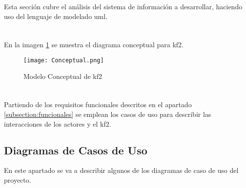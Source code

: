 

Esta sección cubre el análisis del sistema de información a desarrollar, haciendo uso del lenguaje de modelado \gls{uml}.

\section{}

En la imagen \ref{image:modeloconceptual} se muestra el diagrama conceptual para \gls{kf2}.

\begin{figure}[H]
  \centering
     \texttt{[image: Conceptual.png]}
  \caption{Modelo Conceptual de \gls{kf2}}
  \label{image:modeloconceptual}
\end{figure}

\section{}

Partiendo de los requisitos funcionales descritos en el apartado \ref{subsection:funcionales} se emplean los casos de uso para describir las interacciones de los actores y el \gls{kf2}.


\subsection{Diagramas de Casos de Uso}
En este apartado se va a describir algunos de los diagramas de caso de uso del proyecto. 

